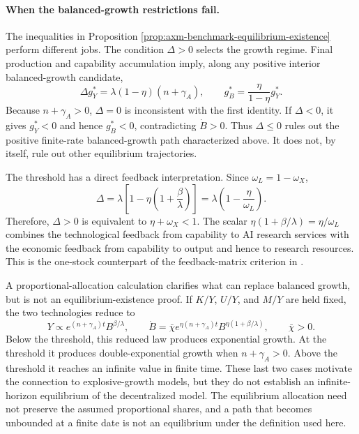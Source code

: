 \paragraph{When the balanced-growth restrictions fail.}
The inequalities in Proposition
\ref{prop:axm-benchmark-equilibrium-existence} perform different jobs. The
condition \(\Delta>0\) selects the growth regime. Final production and
capability accumulation imply,
along any positive interior balanced-growth candidate,
\begin{equation}
 \Delta g_Y^*=\lambda(1-\eta)(n+\gamma_A),
 \qquad
 g_B^*=\frac{\eta}{1-\eta}g_Y^*.
 \label{eq:axm-bgp-feedback-identity}
\end{equation}
Because \(n+\gamma_A>0\), \(\Delta=0\) is inconsistent with the first identity. If
\(\Delta<0\), it gives \(g_Y^*<0\) and hence \(g_B^*<0\), contradicting
\(\dot B>0\). Thus \(\Delta\leq0\) rules out the positive finite-rate
balanced-growth path characterized above. It does not, by itself, rule out
other equilibrium trajectories.

The threshold has a direct feedback interpretation. Since
\(\omega_L=1-\omega_X\),
\begin{equation}
 \Delta
 =\lambda\left[1-\eta\left(1+\frac{\beta}{\lambda}\right)\right]
 =\lambda\left(1-\frac{\eta}{\omega_L}\right).
 \label{eq:axm-scalar-feedback-threshold}
\end{equation}
Therefore, \(\Delta>0\) is equivalent to \(\eta+\omega_X<1\). The scalar
\(\eta(1+\beta/\lambda)=\eta/\omega_L\) combines the technological feedback
from capability to AI research services with the economic feedback from
capability to output and hence to research resources. This is the one-stock
counterpart of the feedback-matrix criterion in \citet{davidsonetal2026}.

A proportional-allocation calculation clarifies what can replace balanced
growth, but is not an equilibrium-existence proof. If \(K/Y\), \(U/Y\), and
\(M/Y\) are held fixed, the two technologies reduce to
\begin{equation}
 Y\propto e^{(n+\gamma_A)t}B^{\beta/\lambda},
 \qquad
 \dot B=\bar\chi e^{\eta(n+\gamma_A)t}
 B^{\eta(1+\beta/\lambda)},
 \qquad \bar\chi>0.
 \label{eq:axm-proportional-feedback-law}
\end{equation}
Below the threshold, this reduced law produces exponential growth. At the
threshold it produces double-exponential growth when \(n+\gamma_A>0\). Above the
threshold it reaches an infinite value in finite time. These last two cases
motivate the connection to explosive-growth models, but they do not establish
an infinite-horizon equilibrium of the decentralized model. The equilibrium
allocation need not preserve the assumed proportional shares, and a path that
becomes unbounded at a finite date is not an equilibrium under the definition
used here.


